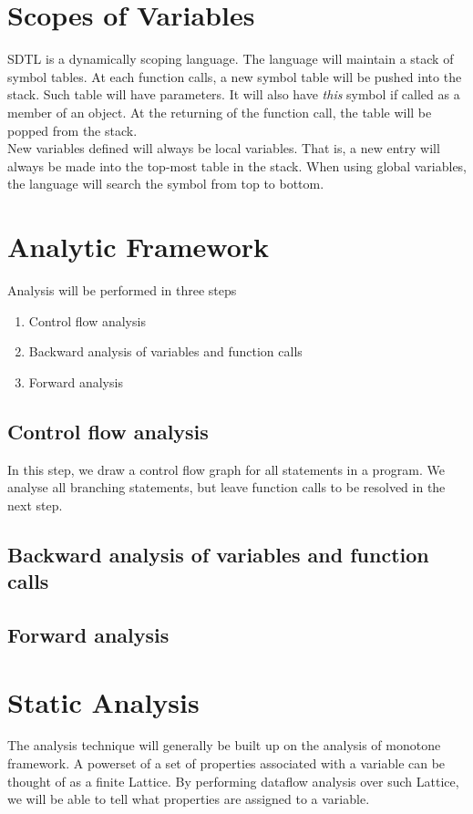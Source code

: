 \documentclass[a4paper,12pt]{article}
\begin{document}
\section{Scopes of Variables}
SDTL is a dynamically scoping language. The language will maintain a stack of symbol tables. At each function calls, a new symbol table will be pushed into the stack. Such table will have parameters. It will also have \textit{this} symbol if called as a member of an object. At the returning of the function call, the table will be popped from the stack.\\
New variables defined will always be local variables. That is, a new entry will always be made into the top-most table in the stack. When using global variables, the language will search the symbol from top to bottom.
\section{Analytic Framework}
Analysis will be performed in three steps\\

\begin{enumerate}
	\item{Control flow analysis}
	\item{Backward analysis of variables and function calls}
	\item{Forward analysis}
\end{enumerate}
\subsection{Control flow analysis}
In this step, we draw a control flow graph for all statements in a program. We analyse all branching statements, but leave function calls to be resolved in the next step.
\subsection{Backward analysis of variables and function calls}
\subsection{Forward analysis}
\section{Static Analysis}
The analysis technique will generally be built up on the analysis of monotone framework. A powerset of a set of properties associated with a variable can be thought of as a finite Lattice. By performing dataflow analysis over such Lattice, we will be able to tell what properties are assigned to a variable.\\
\end{document}
